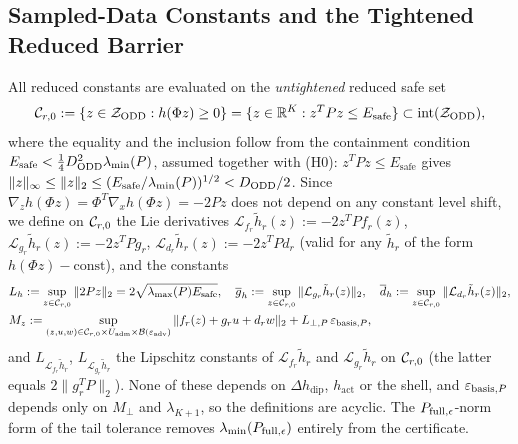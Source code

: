 \subsection{Sampled-Data Constants and the Tightened Reduced Barrier}
All reduced constants are evaluated on the \emph{untightened} reduced safe set
\begin{equation}
\label{eq:Cr0}
\mathcal{C}_{r,0} := \{z \in \mathcal{Z}_{\mathrm{ODD}} : h(\Phi z) \ge 0\} = \{z \in \mathbb{R}^K : z^TPz \le E_{\mathrm{safe}}\} \subset \mathrm{int}(\mathcal{Z}_{\mathrm{ODD}}),
\end{equation}
where the equality and the inclusion follow from the containment condition \(E_{\mathrm{safe}} < \frac{1}{4}D_{\mathrm{ODD}}^2\lambda_{\min}(P)\), assumed together with (H0): \(z^TPz \le E_{\mathrm{safe}}\) gives \(\|z\|_\infty \le \|z\|_2 \le (E_{\mathrm{safe}}/\lambda_{\min}(P))^{1/2} < D_{\mathrm{ODD}}/2\). Since \(\nabla_z h(\Phi z) = \Phi^T\nabla_x h(\Phi z) = -2Pz\) does not depend on any constant level shift, we define on \(\mathcal{C}_{r,0}\) the Lie derivatives \(\mathcal{L}_{f_r}\tilde{h}_r(z) := -2z^TPf_r(z)\), \(\mathcal{L}_{g_r}\tilde{h}_r(z) := -2z^TPg_r\), \(\mathcal{L}_{d_r}\tilde{h}_r(z) := -2z^TPd_r\) (valid for any \(\tilde h_r\) of the form \(h(\Phi z) - \text{const}\)), and the constants
\begin{equation}
\label{eq:reduced_constants}
\begin{aligned}
&L_h := \sup_{z \in \mathcal{C}_{r,0}}\|2Pz\|_2 = 2\sqrt{\lambda_{\max}(P)E_{\mathrm{safe}}}, \quad \overline{g}_h := \sup_{z \in \mathcal{C}_{r,0}}\|\mathcal{L}_{g_r}\tilde{h}_r(z)\|_2, \quad \overline{d}_h := \sup_{z \in \mathcal{C}_{r,0}}\|\mathcal{L}_{d_r}\tilde{h}_r(z)\|_2,\\
&M_z := \sup_{(z,u,w) \in \mathcal{C}_{r,0} \times U_{\mathrm{adm}} \times \mathcal{B}(\varepsilon_{\mathrm{adv}})} \|f_r(z) + g_r u + d_r w\|_2 + L_{\perp,P}\,\varepsilon_{\mathrm{basis},P},
\end{aligned}
\end{equation}
and \(L_{\mathcal{L}_{f_r}\tilde{h}_r}\), \(L_{\mathcal{L}_{g_r}\tilde{h}_r}\) the Lipschitz constants of \(\mathcal{L}_{f_r}\tilde{h}_r\) and \(\mathcal{L}_{g_r}\tilde{h}_r\) on \(\mathcal{C}_{r,0}\) (the latter equals \(2\|g_r^TP\|_2\)). None of these depends on \(\Delta h_{\mathrm{dip}}\), \(h_{\mathrm{act}}\) or the shell, and \(\varepsilon_{\mathrm{basis},P}\) depends only on \(M_\perp\) and \(\lambda_{K+1}\), so the definitions are acyclic. The \(P_{\mathrm{full},\epsilon}\)-norm form of the tail tolerance removes \(\lambda_{\min}(P_{\mathrm{full},\epsilon})\) entirely from the certificate.

